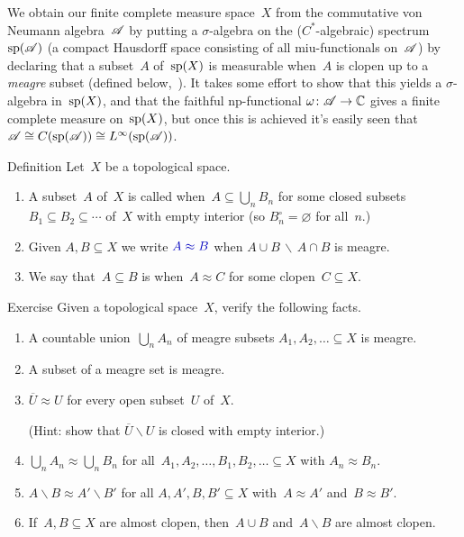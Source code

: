 \documentclass[a]{subfiles}
\begin{document}
\begin{parsec}
\begin{point}
We obtain our finite complete measure space~$X$
from the commutative von Neumann algebra~$\mathscr{A}$
by putting a $\sigma$-algebra
on the ($C^*$-algebraic) spectrum~$\mathrm{sp}(\mathscr{A})$
(a compact Hausdorff space
consisting of all miu-functionals on~$\mathscr{A}$)
by declaring that a subset~$A$ of~$\mathrm{sp}(X)$ 
is measurable when~$A$ is clopen up to
a \emph{meagre} subset
(defined below,~).
It takes some effort to show
that this yields a $\sigma$-algebra
in~$\mathrm{sp}(X)$,
and that the faithful np-functional $\omega\colon\mathscr{A}\to \mathbb{C}$
gives a finite complete measure on~$\mathrm{sp}(X)$,
but once this is achieved
it's easily seen that
$\mathscr{A}\cong C(\mathrm{sp}(\mathscr{A}))\cong L^\infty(\mathrm{sp}(\mathscr{A}))$.
\end{point}
\begin{point}[meagre]{Definition}%
Let~$X$ be a topological space.
\begin{enumerate}
\item
A subset~$A$ of~$X$
is called  when~$A\subseteq \bigcup_n B_n$
for some closed subsets $B_1\subseteq B_2\subseteq \dotsb$
of~$X$ with empty interior (so  $B_n^\circ=\varnothing$
for all~$n$.)
\item
Given $A,B\subseteq X$ 
we write $\Define{A\approx B}$ when
$A\cup B\,\backslash\,A\cap B$
is meagre.
\item
We say that~$A\subseteq B$
is 
when~$A\approx C$
for some clopen~$C\subseteq X$.
\end{enumerate}
\end{point}
\begin{point}{Exercise}%
Given a topological space~$X$,
verify the following facts.
\begin{enumerate}
\item
A countable union~$\bigcup_n A_n$
of meagre subsets $A_1,A_2,\dotsc\subseteq X $ is meagre.
\item
A subset of a meagre set is meagre.
\item
$\overline{U}\approx U$
for every open subset~$U$ of~$X$.

(Hint: show that $\overline{U}\backslash U$
is closed with empty interior.)
\item
$\bigcup_n A_n\approx \bigcup_n B_n$
for all~$A_1,A_2,\dotsc, B_1,B_2,\dotsc\subseteq X$
with $A_n\approx B_n$.
\item
$A\backslash B \approx A'\backslash B'$
for all $A,A',B,B'\subseteq X$
with~$A\approx A'$ and~$B\approx B'$.
\item
If~$A,B\subseteq X$ are almost clopen,
then~$A\cup B$ and~$A\backslash B$ 
are almost clopen.
\end{enumerate}
\end{point}
\end{parsec}
\end{document}
